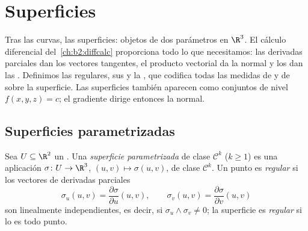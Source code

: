 \chapter{Superficies}\label{ch:b2:surfaces}

Tras las curvas, las superficies: objetos de dos parámetros en $\R^3$.
El cálculo diferencial del~\cref{ch:b2:diffcalc} proporciona todo lo
que necesitamos: las derivadas parciales dan los vectores tangentes, el
producto vectorial da la normal y los  dan las
. Definimos las  regulares, sus
 y la \emph{}, que codifica
todas las medidas de  y de  sobre la superficie. Las
superficies también aparecen como conjuntos de nivel $f(x, y, z) = c$;
el gradiente dirige entonces la normal.

\section{Superficies parametrizadas}

\begin{definition}\label{def:b2:surfaces:param}
Sea $U \subseteq \R^2$ un . Una \emph{superficie
parametrizada} de clase
$\mathcal{C}^k$ ($k \geq 1$) es una aplicación $\sigma \colon U \to
\R^3$, $(u, v) \mapsto \sigma(u, v)$, de clase $\mathcal{C}^k$. Un
punto es \emph{regular} si los vectores de derivadas parciales
\[
\sigma_u(u, v) = \frac{\partial\sigma}{\partial u}(u,v),
\qquad
\sigma_v(u, v) = \frac{\partial\sigma}{\partial v}(u,v)
\]
son linealmente independientes, es decir, si $\sigma_u \wedge
\sigma_v \neq 0$; la superficie es \emph{regular} si lo es todo
punto.
\end{definition}

